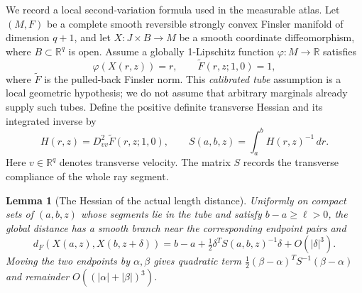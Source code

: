 \documentclass[11pt,reqno]{amsart}
\newtheorem{lemma}[theorem]{Lemma}
\theoremstyle{definition}
\theoremstyle{remark}
\numberwithin{equation}{section}
\newcommand{\R}{\mathbb R}
\begin{document}
We record a local second-variation formula used in the measurable atlas. Let
\((M,F)\) be a complete smooth reversible strongly convex Finsler
manifold of dimension \(q+1\), and let
\(X:J\times B\to M\) be a smooth coordinate diffeomorphism,
where \(B\subset\R^q\) is open. Assume a globally 1-Lipschitz
function \(\varphi:M\to\R\) satisfies
\[
\varphi(X(r,z))=r,\qquad \widetilde F(r,z;1,0)=1,
\]
where \(\widetilde F\) is the pulled-back Finsler norm. This
\emph{calibrated tube} assumption is a local geometric hypothesis;
we do not assume that arbitrary marginals already supply such tubes.
Define the positive definite transverse Hessian and its integrated
inverse by
\begin{equation}
H(r,z)=D^2_{vv}\widetilde F(r,z;1,0),\qquad
S(a,b,z)=\int_a^b H(r,z)^{-1}\,dr.
\label{eq:raytube-compliance}
\end{equation}
Here \(v\in\R^q\) denotes transverse velocity. The matrix \(S\)
records the transverse compliance of the whole ray segment.

\begin{lemma}[The Hessian of the actual length distance]
\label{lem:raytube-distance}
Uniformly on compact sets of \((a,b,z)\) whose segments lie in
the tube and satisfy \(b-a\ge\ell>0\), the global distance has
a smooth branch near the corresponding endpoint pairs and
\[
d_F(X(a,z),X(b,z+\delta))
=b-a+\tfrac12\delta^T S(a,b,z)^{-1}\delta+O(|\delta|^3).
\]
Moving the two endpoints by \(\alpha,\beta\) gives quadratic term
\(\tfrac12(\beta-\alpha)^TS^{-1}(\beta-\alpha)\) and remainder
\(O((|\alpha|+|\beta|)^3)\).
\end{lemma}
\end{document}
